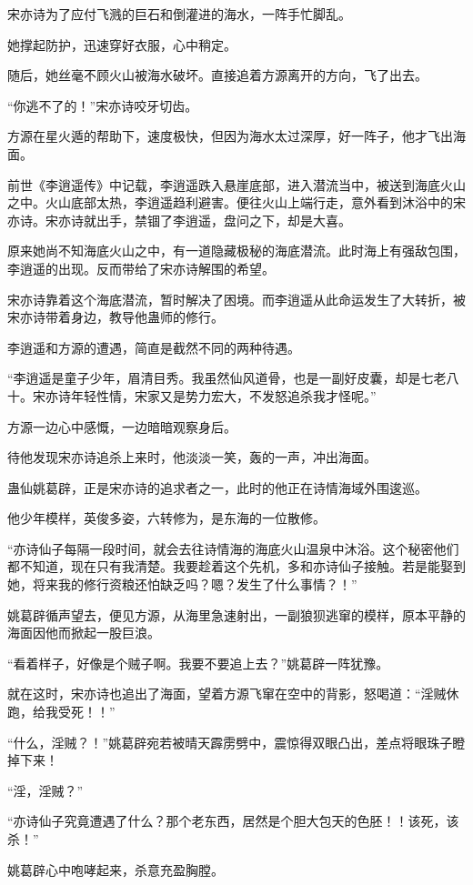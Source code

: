 \begin{this_body}
宋亦诗为了应付飞溅的巨石和倒灌进的海水，一阵手忙脚乱。

她撑起防护，迅速穿好衣服，心中稍定。

随后，她丝毫不顾火山被海水破坏。直接追着方源离开的方向，飞了出去。

“你逃不了的！”宋亦诗咬牙切齿。

方源在星火遁的帮助下，速度极快，但因为海水太过深厚，好一阵子，他才飞出海面。

前世《李逍遥传》中记载，李逍遥跌入悬崖底部，进入潜流当中，被送到海底火山之中。火山底部太热，李逍遥趋利避害。便往火山上端行走，意外看到沐浴中的宋亦诗。宋亦诗就出手，禁锢了李逍遥，盘问之下，却是大喜。

原来她尚不知海底火山之中，有一道隐藏极秘的海底潜流。此时海上有强敌包围，李逍遥的出现。反而带给了宋亦诗解围的希望。

宋亦诗靠着这个海底潜流，暂时解决了困境。而李逍遥从此命运发生了大转折，被宋亦诗带着身边，教导他蛊师的修行。

李逍遥和方源的遭遇，简直是截然不同的两种待遇。

“李逍遥是童子少年，眉清目秀。我虽然仙风道骨，也是一副好皮囊，却是七老八十。宋亦诗年轻性情，宋家又是势力宏大，不发怒追杀我才怪呢。”

方源一边心中感慨，一边暗暗观察身后。

待他发现宋亦诗追杀上来时，他淡淡一笑，轰的一声，冲出海面。

蛊仙姚葛辟，正是宋亦诗的追求者之一，此时的他正在诗情海域外围逡巡。

他少年模样，英俊多姿，六转修为，是东海的一位散修。

“亦诗仙子每隔一段时间，就会去往诗情海的海底火山温泉中沐浴。这个秘密他们都不知道，现在只有我清楚。我要趁着这个先机，多和亦诗仙子接触。若是能娶到她，将来我的修行资粮还怕缺乏吗？嗯？发生了什么事情？！”

姚葛辟循声望去，便见方源，从海里急速射出，一副狼狈逃窜的模样，原本平静的海面因他而掀起一股巨浪。

“看着样子，好像是个贼子啊。我要不要追上去？”姚葛辟一阵犹豫。

就在这时，宋亦诗也追出了海面，望着方源飞窜在空中的背影，怒喝道：“淫贼休跑，给我受死！！”

“什么，淫贼？！”姚葛辟宛若被晴天霹雳劈中，震惊得双眼凸出，差点将眼珠子瞪掉下来！

“淫，淫贼？”

“亦诗仙子究竟遭遇了什么？那个老东西，居然是个胆大包天的色胚！！该死，该杀！”

姚葛辟心中咆哮起来，杀意充盈胸膛。


\end{this_body}
